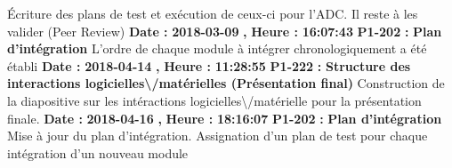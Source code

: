 \documentclass{article}%
\begin{document}
%
Écriture des plans de test et exécution de ceux{-}ci pour l'ADC. Il reste à les valider (Peer Review)\newline%
\newline%
%
\textbf{Date : }%
\textbf{2018{-}03{-}09}%
\textbf{,}%
\textbf{ Heure : }%
\textbf{16:07:43}%
\newline%
%
\textbf{P1{-}202 }%
\textbf{ : }%
\textbf{ Plan d'intégration}%
\newline%
\newline%
%
L'ordre de chaque module à intégrer chronologiquement a été établi\newline%
\newline%
%
\textbf{Date : }%
\textbf{2018{-}04{-}14}%
\textbf{,}%
\textbf{ Heure : }%
\textbf{11:28:55}%
\newline%
%
\textbf{P1{-}222 }%
\textbf{ : }%
\textbf{ Structure des interactions logicielles\textbackslash{}/matérielles (Présentation final)}%
\newline%
\newline%
%
Construction de la diapositive sur les intéractions logicielles\textbackslash{}/matérielle pour la présentation finale.\newline%
\newline%
%
\textbf{Date : }%
\textbf{2018{-}04{-}16}%
\textbf{,}%
\textbf{ Heure : }%
\textbf{18:16:07}%
\newline%
%
\textbf{P1{-}202 }%
\textbf{ : }%
\textbf{ Plan d'intégration}%
\newline%
\newline%
%
Mise à jour du plan d'intégration. Assignation d'un plan de test pour chaque intégration d'un nouveau module\newline%
\newline%
%
\newpage

%
\end{document}
